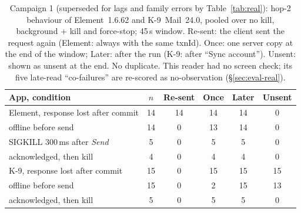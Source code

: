 \begin{table}[!htbp]
\centering
\caption{Campaign 1 (superseded for lags and family errors by Table~\ref{tab:real}): hop-2 behaviour of Element~1.6.62 and K-9~Mail~24.0, pooled over no kill,
background + kill and force-stop; 45\,s window. Re-sent: the client sent the request again (Element: always with the same txnId). Once: one server copy at the end of the
window; Later: after the run (K-9: after ``Sync account''). Unsent: shown as unsent at the end. No duplicate. This reader had no screen check; its five late-read
``co-failures'' are re-scored as no-observation (\S\ref{sec:eval-real}).}
\label{tab:realcone}
\footnotesize
\setlength{\tabcolsep}{2.4pt}
\begin{tabular}{@{}l ccccc@{}}
\toprule
App, condition & $n$ & Re-sent & Once & Later & Unsent \\
\midrule
Element, response lost after commit & 14 & 14 & 14 & 14 & 0 \\
\quad offline before send & 14 & 0 & 13 & 14 & 0 \\
\quad SIGKILL 300\,ms after \emph{Send} & 5 & 0 & 5 & 5 & 0 \\
\quad acknowledged, then kill & 4 & 0 & 4 & 4 & 0 \\
K-9, response lost after commit & 15 & 0 & 15 & 15 & 15 \\
\quad offline before send & 15 & 0 & 2 & 15 & 13 \\
\quad acknowledged, then kill & 5 & 0 & 5 & 5 & 0 \\
\bottomrule
\end{tabular}
\end{table}
